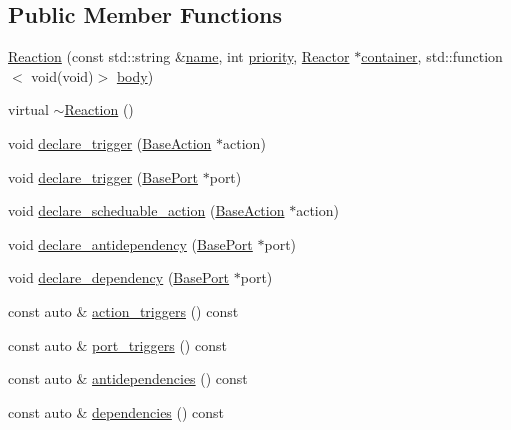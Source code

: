\subsection*{Public Member Functions}
\begin{DoxyCompactItemize}
\item 
\hyperlink{classreactor_1_1Reaction_a5d6b7249352ddb4c0fdde855fea2b191}{Reaction} (const std\+::string \&\hyperlink{classreactor_1_1ReactorElement_a99579f61dbaf5d5d98aebfe26eb8bf77}{name}, int \hyperlink{classreactor_1_1Reaction_a5fb22f21bbdf4f0303bb036d8afdf91e}{priority}, \hyperlink{classreactor_1_1Reactor}{Reactor} $\ast$\hyperlink{classreactor_1_1ReactorElement_a25bf298de879a82eefc1ba426be05812}{container}, std\+::function$<$ void(void)$>$ \hyperlink{classreactor_1_1Reaction_aca4e15066e159bf9c009c87f5ec11180}{body})
\item 
virtual \hyperlink{classreactor_1_1Reaction_aa532060472706da66267b8a6ac6a88ad}{$\sim$\+Reaction} ()
\item 
void \hyperlink{classreactor_1_1Reaction_a5733b0fa4559a2221f3b32f2ce12947a}{declare\+\_\+trigger} (\hyperlink{classreactor_1_1BaseAction}{Base\+Action} $\ast$action)
\item 
void \hyperlink{classreactor_1_1Reaction_a8e4980f5e05c8bedef5d8c7f9c7ec142}{declare\+\_\+trigger} (\hyperlink{classreactor_1_1BasePort}{Base\+Port} $\ast$port)
\item 
void \hyperlink{classreactor_1_1Reaction_acf9c9897530f4a02bdec524456965315}{declare\+\_\+scheduable\+\_\+action} (\hyperlink{classreactor_1_1BaseAction}{Base\+Action} $\ast$action)
\item 
void \hyperlink{classreactor_1_1Reaction_a9808e5479e13e76d2d7151c7afef280b}{declare\+\_\+antidependency} (\hyperlink{classreactor_1_1BasePort}{Base\+Port} $\ast$port)
\item 
void \hyperlink{classreactor_1_1Reaction_a1c0a84a9e241998cfb19377052fff856}{declare\+\_\+dependency} (\hyperlink{classreactor_1_1BasePort}{Base\+Port} $\ast$port)
\item 
const auto \& \hyperlink{classreactor_1_1Reaction_a1f2f04c900ead25ec920bdede95fd8fd}{action\+\_\+triggers} () const
\item 
const auto \& \hyperlink{classreactor_1_1Reaction_af722cdf4be08668017a783ceccdcfa5a}{port\+\_\+triggers} () const
\item 
const auto \& \hyperlink{classreactor_1_1Reaction_aacb42127c5fe2f11f166169ae6ebc56b}{antidependencies} () const
\item 
const auto \& \hyperlink{classreactor_1_1Reaction_a3cc0fd73eab307c5f4110213cc9e2b20}{dependencies} () const

\end{DoxyCompactItemize}
